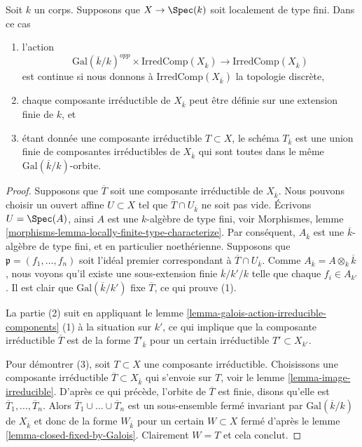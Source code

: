 \begin{lemma}
\label{lemma-galois-action-irreducible-components-locally-finite-type}
Soit $k$ un corps.
Supposons que $X \to \Spec(k)$ soit
localement de type fini. Dans ce cas
\begin{enumerate}
\item l'action
$$
\text{Gal}(\overline{k}/k)^{opp} \times \text{IrredComp}(X_{\overline{k}})
\longrightarrow
\text{IrredComp}(X_{\overline{k}})
$$
est continue si nous donnons à
$\text{IrredComp}(X_{\overline{k}})$ la topologie
discrète, \item chaque composante irréductible de
$X_{\overline{k}}$ peut être définie sur une extension finie
de $k$, et \item étant donnée une composante irréductible
$T \subset X$, le schéma $T_{\overline{k}}$ est une union
finie de composantes irréductibles de $X_{\overline{k}}$ qui
sont toutes dans le même $\text{Gal}(\overline{k}/k)$-orbite.
\end{enumerate}
\end{lemma}

\begin{proof}
Supposons que $\overline{T}$ soit une composante irréductible
de $X_{\overline{k}}$. Nous pouvons choisir un ouvert affine $U
\subset X$ tel que $\overline{T} \cap U_{\overline{k}}$ ne soit
pas vide. Écrivons $U = \Spec(A)$, ainsi $A$ est une
$k$-algèbre de type fini, voir Morphismes, lemme
\ref{morphisms-lemma-locally-finite-type-characterize}. Par
conséquent, $A_{\overline{k}}$ est une $\overline{k}$-algèbre de
type fini, et en particulier noethérienne. Supposons que $\mathfrak
p = (f_1, \ldots, f_n)$ soit l'idéal premier correspondant à
$\overline{T} \cap U_{\overline{k}}$. Comme $A_{\overline{k}} = A
\otimes_k \overline{k}$, nous voyons qu'il existe une sous-extension
finie $\overline{k}/k'/k$ telle que chaque $f_i \in A_{k'}$. Il est clair
que $\text{Gal}(\overline{k}/k')$ fixe $\overline{T}$, ce qui prouve (1).

\medskip\noindent
La partie (2) suit en appliquant le lemme
\ref{lemma-galois-action-irreducible-components} (1) à
la situation sur $k'$, ce qui implique que la composante
irréductible $\overline{T}$ est de la forme
$T'_{\overline{k}}$ pour un certain irréductible $T' \subset X_{k'}$.

\medskip\noindent
Pour démontrer (3), soit $T \subset X$ une composante
irréductible. Choisissons une composante irréductible
$\overline{T} \subset X_{\overline{k}}$ qui s'envoie sur
$T$, voir le lemme \ref{lemma-image-irreducible}. D'après ce
qui précède, l'orbite de $\overline{T}$ est finie, disons
qu'elle est $\overline{T}_1, \ldots, \overline{T}_n$. Alors
$\overline{T}_1 \cup \ldots \cup \overline{T}_n$ est un
sous-ensemble fermé invariant par $\text{Gal}(\overline{k}/k)$
de $X_{\overline{k}}$ et donc de la forme $W_{\overline{k}}$
pour un certain $W \subset X$ fermé d'après le lemme
\ref{lemma-closed-fixed-by-Galois}. Clairement $W = T$ et cela conclut.
\end{proof}

